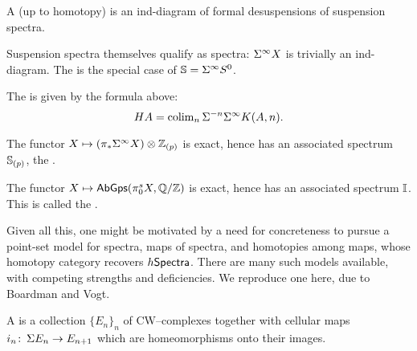 \begin{definition}
A  (up to homotopy) is an ind-diagram of formal desuspensions of suspension spectra.
\end{definition}

\begin{example}
Suspension spectra themselves qualify as spectra: $\Susp^\infty X$ is trivially an ind-diagram.
The  is the special case of $\S = \Susp^\infty S^0$.
\end{example}

\begin{example}
The  is given by the formula above: \[HA = \colim_n \Susp^{-n} \Susp^\infty K(A, n).\]
\end{example}

\begin{example}
The functor $X \mapsto (\pi_* \Susp^\infty X) \otimes \Z_{(p)}$ is exact, hence has an associated spectrum $\S_{(p)}$, the .
\end{example}

\begin{example}
The functor $X \mapsto \CatOf{AbGps}(\pi_0^s X, \Q/\Z)$ is exact, hence has an associated spectrum $\I$.  This is called the .
\end{example}

Given all this, one might be motivated by a need for concreteness to pursue a point-set model for spectra, maps of spectra, and homotopies among maps, whose homotopy category recovers $h\CatOf{Spectra}$.
There are many such models available, with competing strengths and deficiencies.
We reproduce one here, due to Boardman and Vogt.

\begin{definition}
A  is a collection $\{E_n\}_n$ of CW--complexes together with cellular maps $i_n\co \Susp E_n \to E_{n+1}$ which are homeomorphisms onto their images.
\end{definition}

